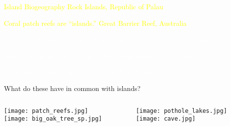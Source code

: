 \documentclass[t,handout]{beamer}  %
\begin{document}

{
\begin{frame}[b]{\textcolor{yellow} {Island Biogeography}}
	\hfill \textcolor{yellow}{Rock Islands, Republic of Palau}
\end{frame}
}

{
\begin{frame}[b]{\textcolor{yellow} {Coral patch reefs are ``islands.''}}
	\hfill \textcolor{yellow}{Great Barrier Reef, Australia}
\end{frame}
}

{
\begin{frame}[b]{\textcolor{white} {Fragmented landscapes are ``islands.''}}
	\hfill \textcolor{white}{Big Oak Tree State Park, Missouri}
\end{frame}
}

{
\begin{frame}[b]{\textcolor{white} {Lakes and springs are ``islands.''}}
	\hfill \textcolor{white}{Pleistocene pothole lakes, Siberia}
\end{frame}
}

{
\begin{frame}[b]{\textcolor{white} {Caves are ``islands.''}}
	\hfill \textcolor{white}{Quadirikiri Cave, New Zealand}
\end{frame}
}

\begin{frame}{What do these have in common with islands?}
	\begin{columns}[T]
		\begin{column}{0.5\textwidth}
			\centering
			\texttt{[image: patch\_reefs.jpg]}\\
			\texttt{[image: big\_oak\_tree\_sp.jpg]}
		\end{column}
		\begin{column}{0.5\textwidth}
			\centering
			\texttt{[image: pothole\_lakes.jpg]}\\
			\texttt{[image: cave.jpg]}
		\end{column}	
	\end{columns}
\end{frame}
\end{document}
